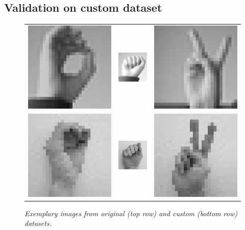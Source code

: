 \documentclass[a4paper]{article}
\begin{document}
\subsection{Validation on custom dataset}
\begin{figure}[t]
     \centering
     \begin{tabular}{ccc}
          \includegraphics[width=.25\linewidth]{graphics/custom_dataset/orig0}&\includegraphics[width=.25\linewidth]{graphics/custom_dataset/orig1}&\includegraphics[width=.25\linewidth]{graphics/custom_dataset/orig2} \\
          \includegraphics[width=.25\linewidth]{graphics/custom_dataset/custom0}&\includegraphics[width=.25\linewidth]{graphics/custom_dataset/custom1}&\includegraphics[width=.25\linewidth]{graphics/custom_dataset/custom2}
     \end{tabular}
     \caption{\textit{Exemplary images from original (top row) and custom (bottom row) datasets.}}
     \label{fig:custom_dataset} 
\end{figure}
\end{document}
